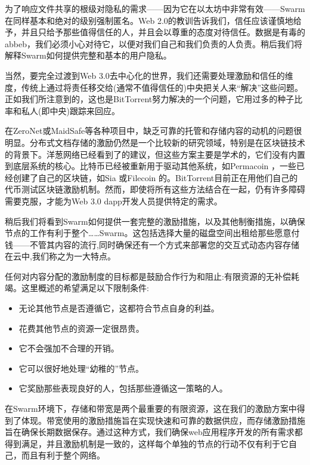 为了响应文件共享的根级对隐私的需求——因为它在以太坊中非常有效——Swarm在同样基本和绝对的级别强制匿名。Web 2.0的教训告诉我们，信任应该谨慎地给予，并且只给予那些值得信任的人，并且会以尊重的态度对待信任。数据是有毒的abbeb，我们必须小心对待它，以便对我们自己和我们负责的人负责。稍后我们将解释Swarm如何提供完整和基本的用户隐私。

当然，要完全过渡到Web 3.0去中心化的世界，我们还需要处理激励和信任的维度，传统上通过将责任移交给(通常不值得信任的)中央把关人来“解决”这些问题。正如我们所注意到的，这也是BitTorrent努力解决的一个问题，它用过多的种子比率和私人(即中央)跟踪来回应。

在ZeroNet或MaidSafe等各种项目中，缺乏可靠的托管和存储内容的动机的问题很明显。分布式文档存储的激励仍然是一个比较新的研究领域，特别是在区块链技术的背景下。洋葱网络已经看到了\cite{jansen2014onions,ghoshetal2014tor}的建议，但这些方案主要是学术的，它们没有内置到底层系统的核心。比特币已经被重新用于驱动其他系统，如Permacoin \cite{miller2014permacoin}，一些已经创建了自己的区块链，如Sia \cite{vorick2014sia}或Filecoin \cite{filecoin2014}的。BitTorrent目前正在用他们自己的代币\cite{tron2018,bittorrent2019}测试区块链激励机制。然而，即使将所有这些方法结合在一起，仍有许多障碍需要克服，才能为Web 3.0 dapp开发人员提供特定的需求。

稍后我们将看到Swarm如何提供一套完整的激励措施，以及其他制衡措施，以确保节点的工作有利于整个……Swarm。这包括选择大量的磁盘空间出租给那些愿意付钱——不管其内容的流行,同时确保还有一个方式来部署您的交互式动态内容存储在云中,我们称之为一大特点。

任何对内容分配的激励制度的目标都是鼓励合作行为和阻止:有限资源的无补偿耗竭。这里概述的希望满足以下限制条件:

\begin{itemize}
    \item 无论其他节点是否遵循它，这都符合节点自身的利益。
    \item 花费其他节点的资源一定很昂贵。
    \item 它不会强加不合理的开销。
    \item 它可以很好地处理“幼稚的”节点。
    \item 它奖励那些表现良好的人，包括那些遵循这一策略的人。
\end{itemize}

在Swarm环境下，存储和带宽是两个最重要的有限资源，这在我们的激励方案中得到了体现。带宽使用的激励措施旨在实现快速和可靠的数据供应，而存储激励措施旨在确保长期数据保存。通过这种方式，我们确保web应用程序开发的所有需求都得到满足，并且激励机制是一致的，这样每个单独的节点的行动不仅有利于它自己，而且有利于整个网络。 

